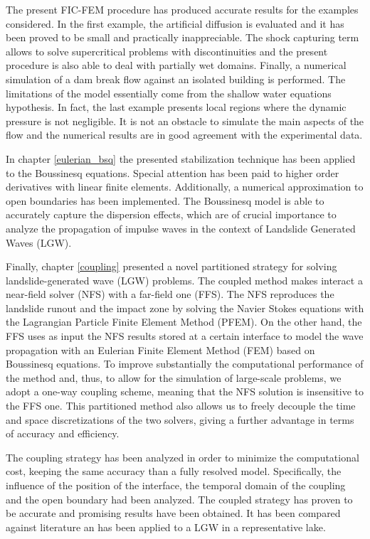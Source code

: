 The present FIC-FEM procedure has produced accurate results for the examples considered.
In the first example, the artificial diffusion is evaluated and it has been proved to be small and practically inappreciable. The shock capturing term allows to solve supercritical problems with discontinuities and the present procedure is also able to deal with partially wet domains. Finally, a numerical simulation of a dam break flow against an isolated building is performed.
The limitations of the model essentially come from the shallow water equations hypothesis. In fact, the last example presents local regions where the dynamic pressure is not negligible. It is not an obstacle to simulate the main aspects of the flow and the numerical results are in good agreement with the experimental data.

In chapter \ref{eulerian_bsq} the presented stabilization technique has been applied to the Boussinesq equations. Special attention has been paid to higher order derivatives with linear finite elements. Additionally, a numerical approximation to open boundaries has been implemented. The Boussinesq model is able to accurately capture the dispersion effects, which are of crucial importance to analyze the propagation of impulse waves in the context of Landslide Generated Waves (LGW).

Finally, chapter \ref{coupling} presented a novel partitioned strategy for solving landslide-generated wave (LGW) problems. The coupled method makes interact a near-field solver (NFS) with a far-field one (FFS). The NFS reproduces the landslide runout and the impact zone by solving the Navier Stokes equations with the Lagrangian Particle Finite Element Method (PFEM). On the other hand, the FFS uses as input the NFS results stored at a certain interface to model the wave propagation with an Eulerian Finite Element Method (FEM) based on Boussinesq equations. To improve substantially the computational performance of the method and, thus, to allow for the simulation of large-scale problems, we adopt a one-way coupling scheme, meaning that the NFS solution is insensitive to the FFS one. This partitioned method also allows us to freely decouple the time and space discretizations of the two solvers, giving a further advantage in terms of accuracy and efficiency.

The coupling strategy has been analyzed in order to minimize the computational cost, keeping the same accuracy than a fully resolved model. Specifically, the influence of the position of the interface, the temporal domain of the coupling and the open boundary had been analyzed.
The coupled strategy has proven to be accurate and promising results have been obtained. It has been compared against literature an has been applied to a LGW in a representative lake.


